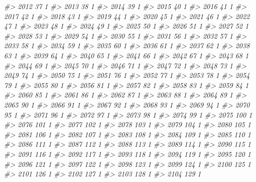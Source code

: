 \documentclass[]{article}
\newenvironment{Shaded}{\begin{snugshade}}{\end{snugshade}}
\newcommand{\CommentTok}[1]{\textcolor[rgb]{0.56,0.35,0.01}{\textit{#1}}}
\begin{document}
\begin{Shaded}
\begin{Highlighting}[]
\CommentTok{#> 2012  37  1}
\CommentTok{#> 2013  38  1}
\CommentTok{#> 2014  39  1}
\CommentTok{#> 2015  40  1}
\CommentTok{#> 2016  41  1}
\CommentTok{#> 2017  42  1}
\CommentTok{#> 2018  43  1}
\CommentTok{#> 2019  44  1}
\CommentTok{#> 2020  45  1}
\CommentTok{#> 2021  46  1}
\CommentTok{#> 2022  47  1}
\CommentTok{#> 2023  48  1}
\CommentTok{#> 2024  49  1}
\CommentTok{#> 2025  50  1}
\CommentTok{#> 2026  51  1}
\CommentTok{#> 2027  52  1}
\CommentTok{#> 2028  53  1}
\CommentTok{#> 2029  54  1}
\CommentTok{#> 2030  55  1}
\CommentTok{#> 2031  56  1}
\CommentTok{#> 2032  57  1}
\CommentTok{#> 2033  58  1}
\CommentTok{#> 2034  59  1}
\CommentTok{#> 2035  60  1}
\CommentTok{#> 2036  61  1}
\CommentTok{#> 2037  62  1}
\CommentTok{#> 2038  63  1}
\CommentTok{#> 2039  64  1}
\CommentTok{#> 2040  65  1}
\CommentTok{#> 2041  66  1}
\CommentTok{#> 2042  67  1}
\CommentTok{#> 2043  68  1}
\CommentTok{#> 2044  69  1}
\CommentTok{#> 2045  70  1}
\CommentTok{#> 2046  71  1}
\CommentTok{#> 2047  72  1}
\CommentTok{#> 2048  73  1}
\CommentTok{#> 2049  74  1}
\CommentTok{#> 2050  75  1}
\CommentTok{#> 2051  76  1}
\CommentTok{#> 2052  77  1}
\CommentTok{#> 2053  78  1}
\CommentTok{#> 2054  79  1}
\CommentTok{#> 2055  80  1}
\CommentTok{#> 2056  81  1}
\CommentTok{#> 2057  82  1}
\CommentTok{#> 2058  83  1}
\CommentTok{#> 2059  84  1}
\CommentTok{#> 2060  85  1}
\CommentTok{#> 2061  86  1}
\CommentTok{#> 2062  87  1}
\CommentTok{#> 2063  88  1}
\CommentTok{#> 2064  89  1}
\CommentTok{#> 2065  90  1}
\CommentTok{#> 2066  91  1}
\CommentTok{#> 2067  92  1}
\CommentTok{#> 2068  93  1}
\CommentTok{#> 2069  94  1}
\CommentTok{#> 2070  95  1}
\CommentTok{#> 2071  96  1}
\CommentTok{#> 2072  97  1}
\CommentTok{#> 2073  98  1}
\CommentTok{#> 2074  99  1}
\CommentTok{#> 2075 100  1}
\CommentTok{#> 2076 101  1}
\CommentTok{#> 2077 102  1}
\CommentTok{#> 2078 103  1}
\CommentTok{#> 2079 104  1}
\CommentTok{#> 2080 105  1}
\CommentTok{#> 2081 106  1}
\CommentTok{#> 2082 107  1}
\CommentTok{#> 2083 108  1}
\CommentTok{#> 2084 109  1}
\CommentTok{#> 2085 110  1}
\CommentTok{#> 2086 111  1}
\CommentTok{#> 2087 112  1}
\CommentTok{#> 2088 113  1}
\CommentTok{#> 2089 114  1}
\CommentTok{#> 2090 115  1}
\CommentTok{#> 2091 116  1}
\CommentTok{#> 2092 117  1}
\CommentTok{#> 2093 118  1}
\CommentTok{#> 2094 119  1}
\CommentTok{#> 2095 120  1}
\CommentTok{#> 2096 121  1}
\CommentTok{#> 2097 122  1}
\CommentTok{#> 2098 123  1}
\CommentTok{#> 2099 124  1}
\CommentTok{#> 2100 125  1}
\CommentTok{#> 2101 126  1}
\CommentTok{#> 2102 127  1}
\CommentTok{#> 2103 128  1}
\CommentTok{#> 2104 129  1}

\end{Highlighting}
\end{Shaded}
\end{document}
